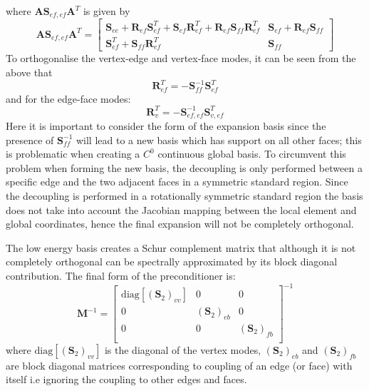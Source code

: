 %
where $\mathbf{A}\mathbf{S}_{ef,ef}\mathbf{A}^{T}$ is given by
%
\[
\mathbf{A}\mathbf{S}_{ef,ef}\mathbf{A}^{T}=\left[ \begin{array}{cc}
\mathbf{S}_{ee}+\mathbf{R}_{ef}\mathbf{S}^{T}_{ef}+\mathbf{S}_{ef}\mathbf{R}^{T}_{ef}+\mathbf{R}_{ef}\mathbf{S}_{ff}\mathbf{R}^{T}_{ef} & \mathbf{S}_{ef}+\mathbf{R}_{ef}\mathbf{S}_{ff}\\
\mathbf{S}^{T}_{ef}+\mathbf{S}_{ff}\mathbf{R}^{T}_{ef} & \mathbf{S}_{ff}
 \end{array} \right]
\]
%
To orthogonalise the vertex-edge and vertex-face modes, it can be seen from the
above that
%
\[
\mathbf{R}^{T}_{ef}=-\mathbf{S}^{-1}_{ff}\mathbf{S}^{T}_{ef}
\]
%
and for the edge-face modes:
%
\[
\mathbf{R}^{T}_{v}=-\mathbf{S}^{-1}_{ef,ef}\mathbf{S}^{T}_{v,ef}
\]
%
Here it is important to consider the form of the expansion basis since the
presence of $\mathbf{S}^{-1}_{ff}$ will lead to a new basis which has support on
all other faces; this is problematic when creating a $C^{0}$ continuous global
basis.  To circumvent this problem when forming the new basis, the decoupling is
only performed between a specific edge and the two adjacent faces in a symmetric
standard region. Since the decoupling is performed in a rotationally symmetric
standard region the basis does not take into account the Jacobian mapping
between the local element and global coordinates, hence the final expansion will
not be completely orthogonal.

The low energy basis creates a Schur complement matrix that although it is not
completely orthogonal can be spectrally approximated by its block diagonal
contribution. The final form of the preconditioner is:
%
\[
\mathbf{M}^{-1}=\left[ \begin{array}{ccc}
\mathrm{diag}[(\mathbf{S}_{2})_{vv}] & 0 & 0 \\
0 & (\mathbf{S}_{2})_{eb} & 0\\
0 & 0 & (\mathbf{S}_{2})_{fb}\\
 \end{array} \right]^{-1}
\]
%
where $\mathrm{diag}[(\mathbf{S}_{2})_{vv}]$ is the diagonal of the vertex
modes, $(\mathbf{S}_{2})_{eb}$ and $(\mathbf{S}_{2})_{fb}$ are block diagonal
matrices corresponding to coupling of an edge (or face) with itself i.e ignoring
the coupling to other edges and faces.
